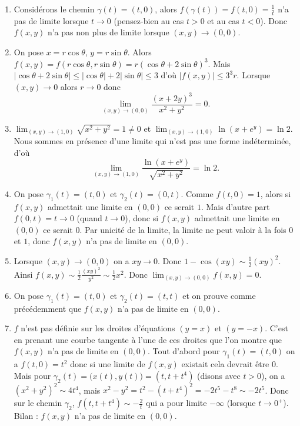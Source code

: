 \documentclass[11pt,a4paper]{article}
\renewcommand{\le}{\leqslant} \renewcommand{\leq}{\leqslant}
\theoremstyle{exostyle}
\begin{document}
\begin{enumerate}  
	\item Considérons le chemin  $\gamma(t) = (t,0)$, alors 
	$f(\gamma(t)) = f(t,0) = \frac{1}{t}$ n'a pas de limite lorsque $t \to 0$ (pensez-bien au cas $t>0$ et au cas $t<0$).
	Donc $f(x,y)$ n'a pas non plus de limite lorsque $(x,y)\to (0,0)$.
	
	
	\item On pose $x=r\cos\theta$, $y=r\sin\theta$.
	Alors $f(x,y) = f(r\cos\theta,r\sin\theta) = r(\cos \theta +2 \sin \theta)^3$.
	Mais $|\cos \theta +2 \sin \theta| \le |\cos\theta| + 2 |\sin\theta| \le 3$  d'où
	$| f(x,y) | \le 3^3 r$. Lorsque $(x,y) \to 0$ alors $r\to 0$ donc 
	\[
	\lim_{(x,y)\to (0,0)} \frac{(x+2y)^3}{x^2+y^2} =0.
	\]
	
	\item  
	$\lim_{(x,y)\to (1,0)} {\sqrt{x^2+y^2}} =1 \ne 0$ et
	$\lim_{(x,y)\to (1,0)} {\ln (x+e^y)}=\ln 2$. Nous sommes en présence d'une limite qui n'est pas une forme indéterminée, d'où
	\[
	\lim_{(x,y)\to (1,0)} \frac{\ln (x+e^y)}{\sqrt{x^2+y^2}}=\ln 2. 
	\]
	
	\item 
	On pose $\gamma_1(t) = (t,0)$ et $\gamma_2(t) = (0,t)$.
	Comme $f(t,0) = 1$, alors si $f(x,y)$ admettait une limite en $(0,0)$ ce serait $1$.
	Mais d'autre part $f(0,t) = t \to 0$ (quand $t\to0$), donc si $f(x,y)$ admettait une limite en $(0,0)$ ce serait $0$. Par unicité de la limite, la limite ne peut valoir à la fois $0$ et $1$, donc $f(x,y)$ n'a pas de limite en $(0,0)$.
	
	\item Lorsque $(x,y) \to (0,0)$ on a $xy \to 0$.
	Donc $1-\cos(xy) \sim \frac12 (xy)^2$. Ainsi
	$f(x,y) \sim \frac12\frac{(xy)^2}{y^2} \sim \frac12x^2$.
	Donc $\lim_{(x,y)\to (0,0)} f(x,y) =0$.
	
	\item On pose $\gamma_1(t) = (t,0)$ et $\gamma_2(t) = (t,t)$ et on prouve comme précédemment que $f(x,y)$ n'a pas de limite en $(0,0)$.
	
	\item $f$ n'est pas définie sur les droites d'équations $(y=x)$ et $(y=-x)$.
	C'est en prenant une courbe tangente à l'une de ces droites que l'on montre que $f(x,y)$ n'a pas de limite en $(0,0)$.
	Tout d'abord pour $\gamma_1(t) = (t,0)$ on a $f(t,0) = t^2$ donc si une limite de $f(x,y)$ existait cela devrait être $0$.
	Mais pour $\gamma_2(t) = \big(x(t),y(t)\big) = (t,t+t^4)$ (disons avec $t>0$), on a  
	$(x^2+y^2)^2 \sim 4t^4$, mais $x^2-y^2 = t^2 - (t+t^4)^2 = -2t^5-t^8 \sim -2t^5$.
	Donc sur le chemin $\gamma_2$, $f(t,t+t^4) \sim -\frac{2}{t}$ qui a pour limite $-\infty$ (lorsque $t\to0^+$).
	Bilan : $f(x,y)$ n'a pas de limite en $(0,0)$.
	
	
	
\end{enumerate}
\fincorrection
\finexercice
\end{document}
